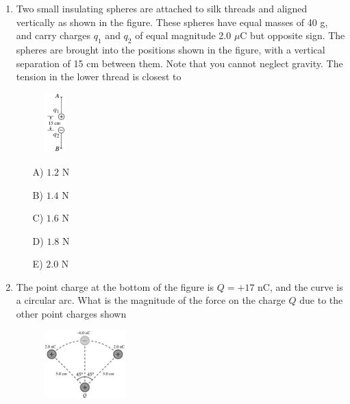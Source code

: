 \begin{enumerate}

    \item Two small insulating spheres are attached to silk threads and aligned vertically as shown in the figure. These spheres have equal masses of 40 g, and carry charges $q_1$ and $q_2$ of equal magnitude 2.0 $\mu$C but opposite sign. The spheres are brought into the positions shown in the figure, with a vertical separation of 15 cm between them. Note that you cannot neglect gravity. The tension in the lower thread is closest to

    \begin{figure}[H]
        \centering
        \includegraphics[width=0.08\textwidth]{figures-workshop01/problem-6.png}
    \end{figure}

    \begin{multicols}{5}
    \begin{itemize}
        \item[A)] $1.2$ N
        \item[B)] $1.4$ N
        \item[C)] $1.6$ N
        \item[D)] $1.8$ N
        \item[E)] $2.0$ N
    \end{itemize}
    \end{multicols}

    
    \item The point charge at the bottom of the figure is $Q=+17$ nC, and the curve is a circular arc. What is the magnitude of the force on the charge $Q$ due to the other point charges shown

    \begin{figure}[H]
        \centering
        \includegraphics[width=0.3\textwidth]{figures-workshop01/problem-7.png}
    \end{figure}


\end{enumerate}
